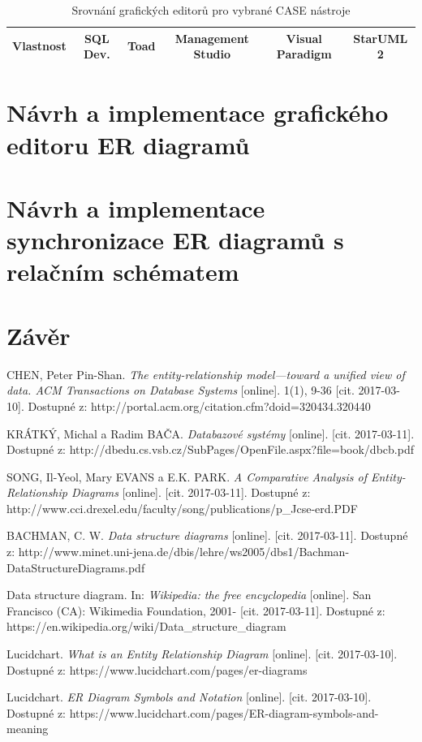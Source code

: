 \documentclass[czech,bachelor,public,dept460,male,oneside]{diploma}
\begin{document}
	\begin{table}[!h]
		\centering
		\label{tab:graphicEditorCmp}
		\caption{Srovnání grafických editorů pro vybrané CASE nástroje}
	\begin{tabular}{l c c c c c}
		\toprule
		Vlastnost & SQL Dev. & Toad & Management Studio & Visual Paradigm & StarUML 2 \\
		\midrule
		
		\midrule
	\end{tabular}
	\end{table}
	
	
	
\newpage
\section{Návrh a implementace grafického editoru ER diagramů}

\newpage
\section{Návrh a implementace synchronizace ER diagramů s relačním schématem}

\newpage
\section{Závěr}

\newpage
\begin{thebibliography}{99}
	 CHEN, Peter Pin-Shan. \textit{The entity-relationship model---toward a unified view of data. ACM Transactions on Database Systems} [online]. 1(1), 9-36 [cit. 2017-03-10]. Dostupné z: http://portal.acm.org/citation.cfm?doid=320434.320440
	
	 KRÁTKÝ, Michal a Radim BAČA. \textit{Databazové systémy} [online]. [cit. 2017-03-11]. Dostupné z: http://dbedu.cs.vsb.cz/SubPages/OpenFile.aspx?file=book/dbcb.pdf
	
	 SONG, Il-Yeol, Mary EVANS a E.K. PARK. \textit{A Comparative Analysis of Entity-Relationship Diagrams} [online]. [cit. 2017-03-11]. Dostupné z: http://www.cci.drexel.edu/faculty/song/publications/p{\_}Jcse-erd.PDF
	
	 BACHMAN, C. W. \textit{Data structure diagrams} [online]. [cit. 2017-03-11]. Dostupné z: http://www.minet.uni-jena.de/dbis/lehre/ws2005/dbs1/Bachman-DataStructureDiagrams.pdf
	
	 Data structure diagram. In: \textit{Wikipedia: the free encyclopedia} [online]. San Francisco (CA): Wikimedia Foundation, 2001- [cit. 2017-03-11]. Dostupné z: https://en.wikipedia.org/wiki/Data{\_}structure{\_}diagram
	
	Lucidchart. \textit{What is an Entity Relationship Diagram} [online]. [cit. 2017-03-10]. Dostupné z: https://www.lucidchart.com/pages/er-diagrams
	
	Lucidchart. \textit{ER Diagram Symbols and Notation} [online]. [cit. 2017-03-10]. Dostupné z: https://www.lucidchart.com/pages/ER-diagram-symbols-and-meaning	
\end{thebibliography}
\end{document}
